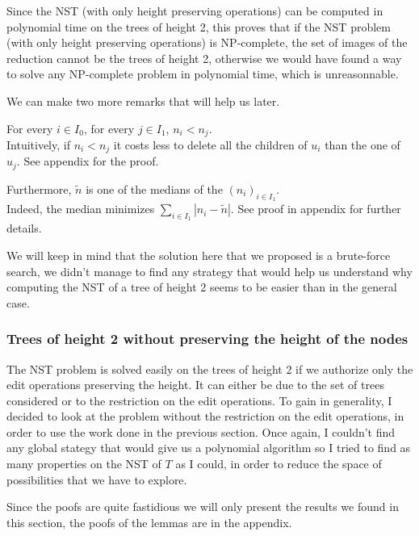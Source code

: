 Since the NST (with only height preserving operations) can be computed
in polynomial time on the trees of height 2, this proves that if the
NST problem (with only height preserving operations) is NP-complete,
the set of images of the reduction cannot be the trees of height 2,
otherwise we would have found a way to solve any NP-complete problem
in polynomial time, which is unreasonnable.

We can make two more remarks that will help us later. 

\begin{remark} 
  For every $i \in I_{0}$, for
  every $j \in I_{1}$, $n_{i} < n_{j}$.\\
  Intuitively, if $n_{i} < n_{j}$ it costs less to delete all the
  children of $u_{i}$ than the one of $u_{j}$. See appendix for the proof.
\end{remark}

\begin{remark}
  Furthermore, $\tilde{n}$ is one of the medians of the
  $(n_{i})_{i \in I_{1}}$. \\
  Indeed, the median minimizes
  $\sum_{i \in I_{1}} \left| n_{i} - \tilde{n} \right|$. See proof in
  appendix for further details.
\end{remark}

We will keep in mind that the solution here that we proposed is a
brute-force search, we didn't manage to find any strategy that would
help us understand why computing the NST of a tree of height 2 seems
to be easier than in the general case.

\subsubsection{Trees of height 2 without preserving the height of the
  nodes}

The NST problem is solved easily on the trees of height 2 if we
authorize only the edit operations preserving the height. It can
either be due to the set of trees considered or to the restriction on
the edit operations. To gain in generality, I decided to look at the
problem without the restriction on the edit operations, in order to
use the work done in the previous section. Once again, I couldn't find
any global stategy that would give us a polynomial algorithm so I
tried to find as many properties on the NST of $T$ as I could, in
order to reduce the space of possibilities that we have to explore.

Since the poofs are quite fastidious we will only present the results
we found in this section, the poofs of the lemmas are in the appendix.

